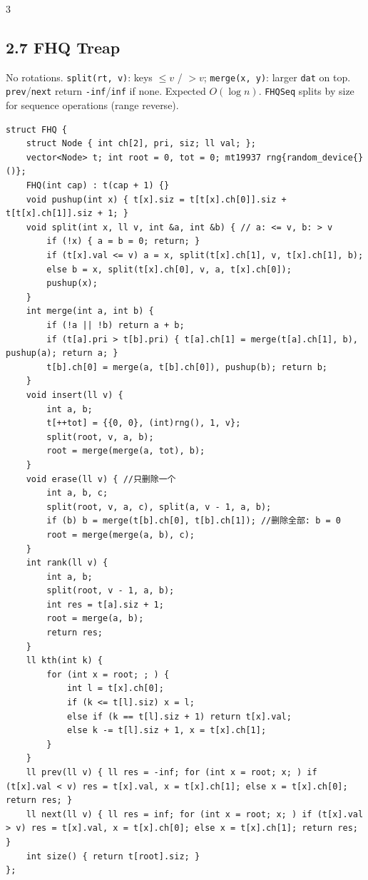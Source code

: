 \documentclass[8pt]{extarticle}
\begin{document}
\begin{multicols*}{3}
\subsection*{2.7 FHQ Treap}

No rotations. \texttt{split(rt, v)}: keys $\le v$ / $> v$; \texttt{merge(x, y)}: larger \texttt{dat} on top. \texttt{prev}/\texttt{next} return \texttt{-inf}/\texttt{inf} if none. Expected $O(\log n)$. \texttt{FHQSeq} splits by size for sequence operations (range reverse).

\begin{lstlisting}
struct FHQ {
    struct Node { int ch[2], pri, siz; ll val; };
    vector<Node> t; int root = 0, tot = 0; mt19937 rng{random_device{}()};
    FHQ(int cap) : t(cap + 1) {}
    void pushup(int x) { t[x].siz = t[t[x].ch[0]].siz + t[t[x].ch[1]].siz + 1; }
    void split(int x, ll v, int &a, int &b) { // a: <= v, b: > v
        if (!x) { a = b = 0; return; }
        if (t[x].val <= v) a = x, split(t[x].ch[1], v, t[x].ch[1], b);
        else b = x, split(t[x].ch[0], v, a, t[x].ch[0]);
        pushup(x);
    }
    int merge(int a, int b) {
        if (!a || !b) return a + b;
        if (t[a].pri > t[b].pri) { t[a].ch[1] = merge(t[a].ch[1], b), pushup(a); return a; }
        t[b].ch[0] = merge(a, t[b].ch[0]), pushup(b); return b;
    }
    void insert(ll v) {
        int a, b;
        t[++tot] = {{0, 0}, (int)rng(), 1, v};
        split(root, v, a, b);
        root = merge(merge(a, tot), b);
    }
    void erase(ll v) { //只删除一个
        int a, b, c;
        split(root, v, a, c), split(a, v - 1, a, b);
        if (b) b = merge(t[b].ch[0], t[b].ch[1]); //删除全部: b = 0
        root = merge(merge(a, b), c);
    }
    int rank(ll v) {
        int a, b;
        split(root, v - 1, a, b);
        int res = t[a].siz + 1;
        root = merge(a, b);
        return res;
    }
    ll kth(int k) {
        for (int x = root; ; ) {
            int l = t[x].ch[0];
            if (k <= t[l].siz) x = l;
            else if (k == t[l].siz + 1) return t[x].val;
            else k -= t[l].siz + 1, x = t[x].ch[1];
        }
    }
    ll prev(ll v) { ll res = -inf; for (int x = root; x; ) if (t[x].val < v) res = t[x].val, x = t[x].ch[1]; else x = t[x].ch[0]; return res; }
    ll next(ll v) { ll res = inf; for (int x = root; x; ) if (t[x].val > v) res = t[x].val, x = t[x].ch[0]; else x = t[x].ch[1]; return res; }
    int size() { return t[root].siz; }
};
\end{lstlisting}


\end{multicols*}
\end{document}
